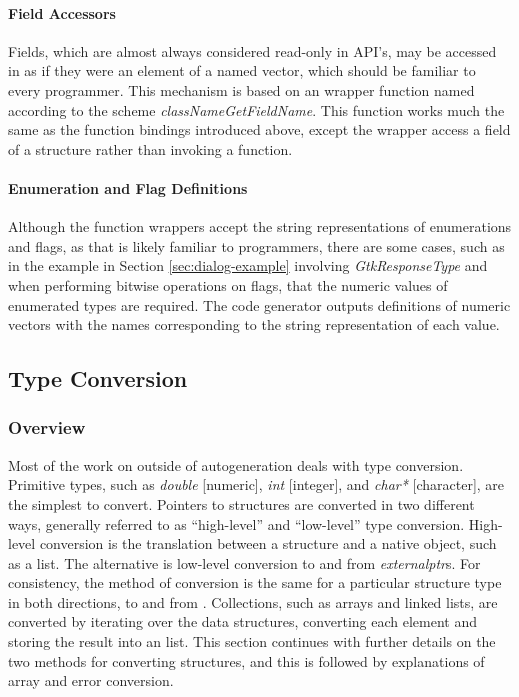 \documentclass[article]{jss}
\begin{document}
\paragraph{Field Accessors}

Fields, which are almost always considered read-only in  API's, 
may be accessed in  as if they were an element of a named vector,
which should be familiar to every  programmer. This mechanism
is based on an  wrapper function named according to the scheme
\emph{classNameGetFieldName}. This function works much the same as the 
function bindings introduced above, except the  wrapper
access a field of a  structure rather than invoking a function.

\paragraph{Enumeration and Flag Definitions}

Although the function wrappers accept the string representations of enumerations 
and flags, as that is likely familiar to  programmers, there are
some cases, such as in the example in Section \ref{sec:dialog-example} involving 
\emph{GtkResponseType} and when performing bitwise operations on flags, that the
numeric values of enumerated types are required. The code generator outputs 
definitions of  numeric vectors with the names corresponding to the
string representation of each value.

\subsection{Type Conversion}

\subsubsection{Overview}

Most of the work on  outside of autogeneration deals with type 
conversion. Primitive types, such as \emph{double} {[}numeric],
\emph{int} {[}integer], and \emph{char{*}} {[}character], are the
simplest to convert. Pointers to  structures are converted
in two different ways, generally referred to as ``high-level''
and ``low-level'' type conversion. High-level conversion is the translation
between a  structure and a native  object, such as a list. 
The alternative is low-level conversion to and from
 \emph{externalptr}s. For consistency, the method of conversion is 
the same for a particular structure type in both directions, to and from .
Collections, such as arrays and linked 
lists, are converted by iterating over the data structures, converting each
element and storing the result into an  list. This section continues
with further details on the two methods for converting 
structures, and this is followed by explanations of array and error conversion.
\end{document}
